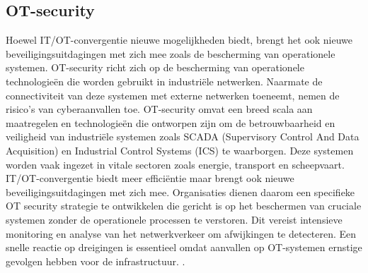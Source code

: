 \subsection{OT-security}
Hoewel IT/OT-convergentie nieuwe mogelijkheden biedt, brengt het ook nieuwe beveiligingsuitdagingen met zich mee zoals de bescherming van operationele systemen.
OT-security richt zich op de bescherming van operationele technologieën die worden gebruikt in industriële netwerken. Naarmate de connectiviteit van deze systemen 
met externe netwerken toeneemt, nemen de risico’s van cyberaanvallen toe. OT-security omvat een breed scala aan maatregelen en technologieën die ontworpen zijn om 
de betrouwbaarheid en veiligheid van industriële systemen zoals SCADA (Supervisory Control And Data Acquisition) en Industrial Control Systems (ICS) te waarborgen. Deze systemen worden vaak ingezet in vitale 
sectoren zoals energie, transport en scheepvaart. IT/OT-convergentie biedt meer efficiëntie maar brengt ook nieuwe 
beveiligingsuitdagingen met zich mee. Organisaties dienen daarom een specifieke OT security strategie te ontwikkelen die gericht is op het beschermen van cruciale systemen 
zonder de operationele processen te verstoren. Dit vereist intensieve monitoring en analyse van het netwerkverkeer om afwijkingen te detecteren. 
Een snelle reactie op dreigingen is essentieel omdat aanvallen op OT-systemen ernstige gevolgen hebben voor de infrastructuur. \autocite{Nomios2024}.



